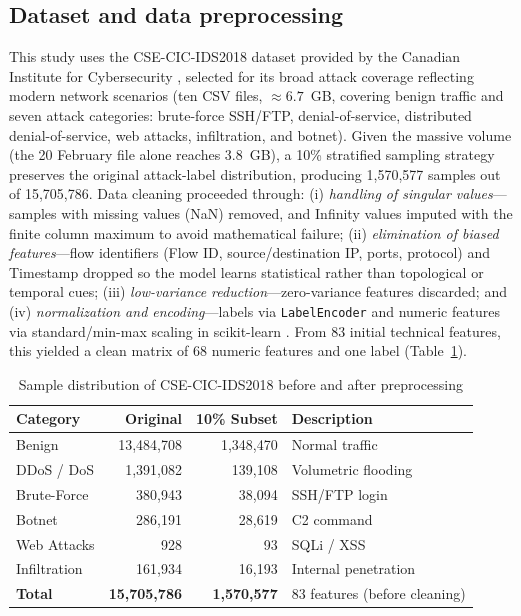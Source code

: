 \documentclass{iaesarticle}
\begin{document}
\subsection{Dataset and data preprocessing}
This study uses the CSE-CIC-IDS2018 dataset provided by the Canadian Institute for Cybersecurity \cite{3}, selected for its broad attack coverage reflecting modern network scenarios (ten CSV files, $\approx6.7$~GB, covering benign traffic and seven attack categories: brute-force SSH/FTP, denial-of-service, distributed denial-of-service, web attacks, infiltration, and botnet). Given the massive volume (the 20 February file alone reaches 3.8~GB), a 10\% stratified sampling strategy \cite{46} preserves the original attack-label distribution, producing 1{,}570{,}577 samples out of 15{,}705{,}786. Data cleaning proceeded through: (i) \textit{handling of singular values}---samples with missing values (NaN) removed, and Infinity values imputed with the finite column maximum to avoid mathematical failure; (ii) \textit{elimination of biased features}---flow identifiers (Flow ID, source/destination IP, ports, protocol) and Timestamp dropped so the model learns statistical rather than topological or temporal cues; (iii) \textit{low-variance reduction}---zero-variance features discarded; and (iv) \textit{normalization and encoding}---labels via \texttt{LabelEncoder} and numeric features via standard/min-max scaling in scikit-learn \cite{47}. From 83 initial technical features, this yielded a clean matrix of 68 numeric features and one label (Table~\ref{tab:distribution}).

\begin{table}[H]
\centering
\fontsize{8pt}{10pt}\selectfont
\caption{Sample distribution of CSE-CIC-IDS2018 before and after preprocessing}
\label{tab:distribution}
\begin{tabular}{l r r l}
\hline
\textbf{Category} & \textbf{Original} & \textbf{10\% Subset} & \textbf{Description} \\ \hline
Benign        & 13{,}484{,}708 & 1{,}348{,}470 & Normal traffic \\
DDoS / DoS    & 1{,}391{,}082  & 139{,}108     & Volumetric flooding \\
Brute-Force   & 380{,}943      & 38{,}094      & SSH/FTP login \\
Botnet        & 286{,}191      & 28{,}619      & C2 command \\
Web Attacks   & 928           & 93           & SQLi / XSS \\
Infiltration  & 161{,}934      & 16{,}193      & Internal penetration \\ \hline
\textbf{Total} & \textbf{15{,}705{,}786} & \textbf{1{,}570{,}577} & 83 features (before cleaning) \\ \hline
\end{tabular}
\end{table}
\end{document}

